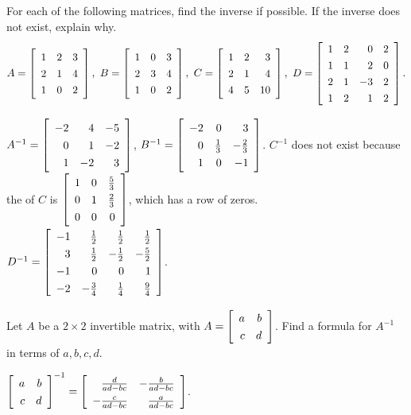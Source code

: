 \documentclass{ximera}
\begin{document}
\begin{example}
  For each of the following matrices, find the inverse if possible. If
  the inverse does not exist, explain why.
  \begin{equation*}
    A=\startmat{rrr}
      1 & 2 & 3 \\
      2 & 1 & 4 \\
      1 & 0 & 2
    \stopmat,
    \quad
    B=\startmat{rrr}
      1 & 0 & 3 \\
      2 & 3 & 4 \\
      1 & 0 & 2
    \stopmat,
    \quad
    C=\startmat{rrr}
      1 & 2 & 3 \\
      2 & 1 & 4 \\
      4 & 5 & 10
    \stopmat,
    \quad
    D=\startmat{rrrr}
      1 & 2 & 0 & 2 \\
      1 & 1 & 2 & 0 \\
      2 & 1 & -3 & 2 \\
      1 & 2 & 1 & 2
    \stopmat.
  \end{equation*}

  \begin{solution}
    \def\arraystretch{1.2}
    $A^{-1} =
    \startmat{rrr}
      -2 & 4 & -5 \\
      0 & 1 & -2 \\
      1 & -2 & 3
    \stopmat$,
    $B^{-1} =
    \startmat{rrr}
      -2 & 0 & 3 \\
      0 & \frac{1}{3} & -\frac{2}{3} \\
      1 & 0 & -1
    \stopmat$.
    $C^{-1}$ does not exist because the {\rref} of $C$ is
    $\startmat{rrr}
      1 & 0 & \frac{5}{3} \\
      0 & 1 & \frac{2}{3} \\
      0 & 0 & 0
    \stopmat$, which has a row of zeros.
    $D^{-1} =
    \startmat{rrrr}
      -1 & \frac{1}{2} &  \frac{1}{2} &  \frac{1}{2} \\
      3 &  \frac{1}{2} & - \frac{1}{2} & - \frac{5}{2} \\
      -1 & 0 & 0 & 1 \\
      -2 & - \frac{3}{4} &  \frac{1}{4} &  \frac{9}{4}
    \stopmat$.
  \end{solution}
\end{example}

\begin{example}
  Let $A$ be a $2\times 2$ invertible matrix, with
  $A=\startmat{rr}
    a & b \\
    c & d
  \stopmat$. Find a formula for $A^{-1}$ in terms of $a,b,c,d$.
  \begin{solution}
    $\def\arraystretch{1.3}
    \startmat{rr}
      a & b \\
      c & d
    \stopmat^{-1}= \startmat{rr}
      \frac{d}{ad-bc} & -\frac{b}{ad-bc} \\
      -\frac{c}{ad-bc} & \frac{a}{ad-bc}
    \stopmat$.
  \end{solution}
\end{example}
\end{document}
